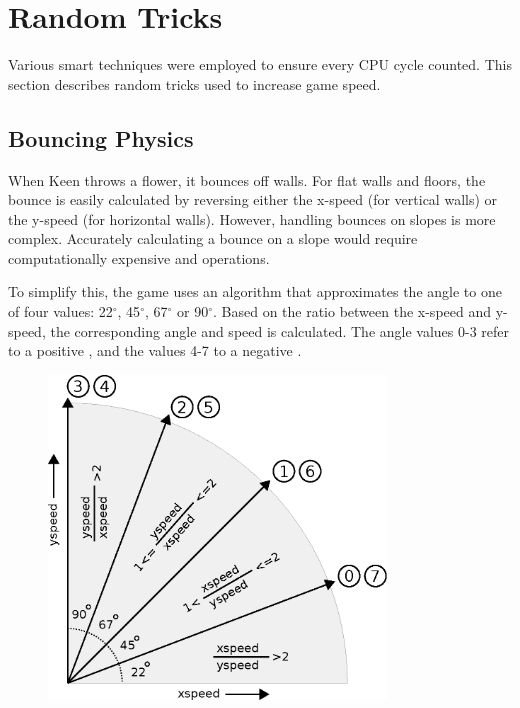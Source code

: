 \documentclass[book.tex]{subfiles}
\begin{document}
\pagebreak

\section{Random Tricks}
Various smart techniques were employed to ensure every CPU cycle counted. This section describes random tricks used to increase game speed.


\subsection{Bouncing Physics}
When Keen throws a flower, it bounces off walls. For flat walls and floors, the bounce is easily calculated by reversing either the x-speed (for vertical walls) or the y-speed (for horizontal walls). However, handling bounces on slopes is more complex. Accurately calculating a bounce on a slope would require computationally expensive  and  operations.\\

\par
To simplify this, the game uses an algorithm that approximates the angle to one of four  values: 22$^{\circ}$, 45$^{\circ}$, 67$^{\circ}$ or 90$^{\circ}$. Based on the ratio between the x-speed and y-speed, the corresponding angle and speed is calculated. The angle values 0-3 refer to a positive , and the values 4-7 to a negative .\\

\par
\begin{figure}[H]
\centering
\includegraphics[width=0.8\textwidth]{imgs/drawings/angle_ratio.eps}
\label{fig:angles}
\end{figure}
\end{document}
